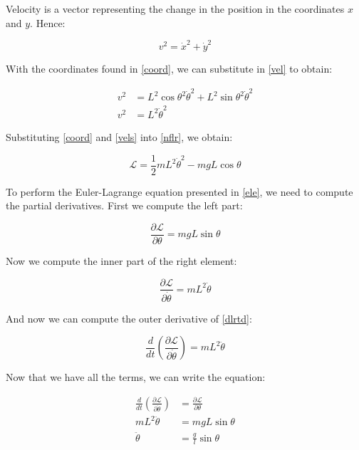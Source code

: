 Velocity is a vector representing the change in the position in the coordinates $x$ and $y$. Hence:

\begin{equation} \label{vel}
	v^2=\dot{x}^2+\dot{y}^2
\end{equation}

With the coordinates found in \ref{coord}, we can substitute in \ref{vel} to obtain:

\begin{equation} \label{vels}
	\begin{split}
		v^2&=L^2\cos{\theta}^2\dot{\theta}^2+L^2\sin{\theta}^2\dot{\theta}^2\\
		v^2&=L^2\dot{\theta}^2
	\end{split}
\end{equation}

Substituting \ref{coord} and \ref{vels} into \ref{nflr}, we obtain:

\begin{equation} \label{les}
	\mathcal{L}=\frac{1}{2}mL^2\dot{\theta}^2-mgL\cos{\theta}
\end{equation}

To perform the Euler-Lagrange equation presented in \ref{ele}, we need to compute the partial derivatives. First we compute the left part:

\begin{equation} \label{dlrt}
	\frac{\partial\mathcal{L}}{\partial\theta}=mgL\sin{\theta}
\end{equation}

Now we compute the inner part of the right element:

\begin{equation} \label{dlrtd}
	\frac{\partial\mathcal{L}}{\partial\dot{\theta}}=mL^2\dot{\theta}
\end{equation}

And now we can compute the outer derivative of \ref{dlrtd}:

\begin{equation} \label{dlrtt}
	\frac{d}{dt}\left( \frac{\partial\mathcal{L}}{\partial\dot{\theta}} \right)=mL^2\ddot{\theta}
\end{equation}

Now that we have all the terms, we can write the equation:

\begin{equation} \label{eles}
	\begin{split}
		\frac{d}{dt}\left( \frac{\partial\mathcal{L}}{\partial\dot{\theta}} \right)&=\frac{\partial\mathcal{L}}{\partial\theta}\\
		mL^2\ddot{\theta}&=mgL\sin{\theta}\\
		\ddot{\theta}&=\frac{g}{l}\sin{\theta}
	\end{split}
\end{equation}

